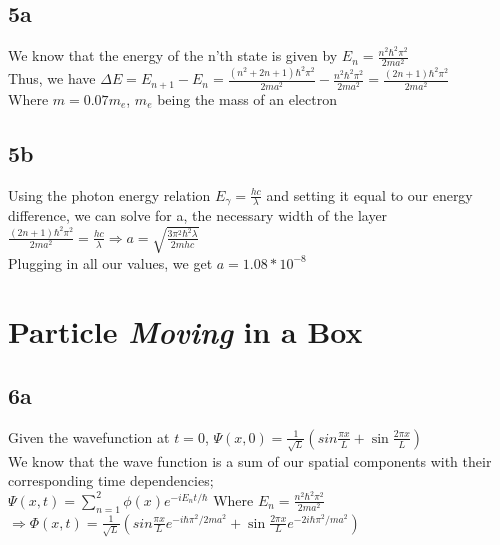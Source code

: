 \documentclass{article}
\begin{document}
\subsection*{5a}

We know that the energy of the n'th state is given by $E_n=\frac{n^2\hbar^2\pi^2}{2ma^2}$\\

Thus, we have $\Delta E=E_{n+1}-E_n=\frac{(n^2+2n+1)\hbar^2\pi^2}{2ma^2}-\frac{n^2\hbar^2\pi^2}{2ma^2}=\frac{(2n+1)\hbar^2\pi^2}{2ma^2}$\\

Where $m=0.07m_e$, $m_e$ being the mass of an electron\\

\subsection*{5b}

Using the photon energy relation $E_\gamma=\frac{hc}{\lambda}$ and setting it equal to our energy difference, we can solve for a, the necessary width of the layer\\

$\frac{(2n+1)\hbar^2\pi^2}{2ma^2}=\frac{hc}{\lambda}\Rightarrow a=\sqrt{\frac{3\pi^2\hbar^2\lambda}{2mhc}}$\\

Plugging in all our values, we get $a=1.08*10^{-8}$\\

\section*{Particle \textit{Moving} in a Box}

\subsection*{6a}

Given the wavefunction at $t=0$, $\Psi(x,0)=\frac{1}{\sqrt{L}}(sin\frac{\pi x}{L}+\sin\frac{2\pi x}{L})$\\

We know that the wave function is a sum of our spatial components with their corresponding time dependencies;\\

$\Psi(x,t)=\sum_{n=1}^2\phi(x)e^{-iE_nt/\hbar}$ Where $E_n=\frac{n^2\hbar^2\pi^2}{2ma^2}$\\

$\Rightarrow\Phi(x,t)=\frac{1}{\sqrt{L}}(sin\frac{\pi x}{L}e^{-i\hbar\pi^2/2ma^2}+\sin\frac{2\pi x}{L}e^{-2i\hbar\pi^2/ma^2})$\\
\end{document}
